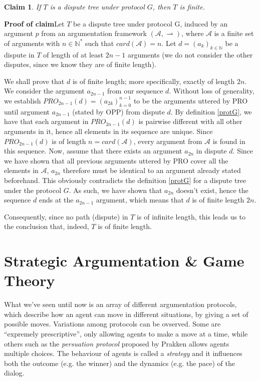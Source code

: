 \documentclass[12pt, a4paper]{article}
\newcommand{\df}{\ensuremath{\rightharpoonup}}
\newtheorem{Claim}{Claim}
\begin{document}
\begin{Claim}
	If $T$ is a dispute tree under protocol $G$, then $T$ is finite.
\end{Claim}


\noindent\textbf{Proof of claim}\quad Let $T$ be a dispute tree under protocol G, induced by an argument $p$ from an argumentation framework $(\mathcal{A}, \df)$, where $\mathcal{A}$ is a finite set of arguments with $n \in \mathbb{N^*}$ such that $card(\mathcal{A}) = n$. Let $d = (a_{k})_{k \in \mathbb{N}}$ be a dispute in $T$ of length of at least $2n - 1$ arguments (we do not consider the other disputes, since we know they are of finite length).

We shall prove that $d$ is of finite length; more specifically, exactly of length $2n$. We consider the argument $a_{2n - 1}$ from our sequence $d$. Without loss of generality, we establish $PRO_{2n-1}(d) = (a_{2k})_{k=0}^{n-1}$ to be the arguments uttered by PRO until argument $a_{2n - 1}$ (stated by OPP) from dispute $d$. By definition \ref{protG}, we have that each argument in $PRO_{2n-1}(d)$ is pairwise different with all other arguments in it, hence all elements in its sequence are unique. Since $PRO_{2n-1}(d)$ is of length $n = card(\mathcal{A})$, every argument from $\mathcal{A}$ is found in this sequence. Now, assume that there exists an argument $a_{2n}$ in dispute $d$. Since we have shown that all previous arguments uttered by PRO cover all the elements in $\mathcal{A}$, $a_{2n}$ therefore must be identical to an argument already stated beforehand. This obviously contradicts the definition \ref{protG} for a dispute tree under the protocol $G$. As such, we have shown that $a_{2n}$ doesn't exist, hence the sequence $d$ ends at the $a_{2n-1}$ argument, which means that $d$ is of finite length $2n$.

Consequently, since no path (dispute) in $T$ is of infinite length, this leads us to the conclusion that, indeed, $T$ is of finite length.



\newpage

\section{Strategic Argumentation \& Game Theory}

What we've seen until now is an array of different argumentation protocols,
which describe how an agent can move in different situations, by giving a set
of possible moves. Variations among protocols can be ovserved. Some are
``expremely prescriptive'', only allowing agents to make a move at a time,
while others such as the \emph{persuation protocol} proposed by Prakken allows
agents multiple choices. The behaviour of agents is called a \emph{strategy}
and it influences both the outcome (e.g. the winner) and the dynamics (e.g. the
pace) of the dialog.
\end{document}
